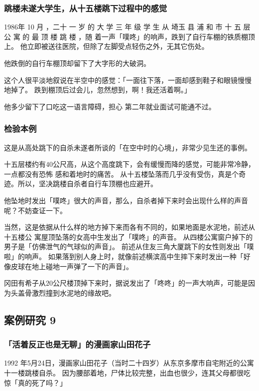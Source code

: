 \documentclass[UTF8]{ctexart}
\begin{document}
\subsubsection*{跳楼未遂大学生，从十五楼跳下过程中的感觉}

1986年 10 月 ，二十 一 岁 的 大 学 三 年 级 学 生 从 埼玉 县 浦 和 市 十 五 层 公 寓 的 最 顶 楼 跳 楼 ，随 着一声「噗咚」的响声，跌到了自行车棚的铁质棚顶上。
他立即被送往医院，但除了左脚受点轻伤之外，无其它伤处。

他跌倒的自行车棚顶却留下了大字形的大破洞。

这个人很平淡地叙说在半空中的感觉：「一面往下落，一面却感到鞋子和眼镜慢慢地掉了。
跌到棚顶后过会儿，忽然想到，啊！我还活着啊。」

他多少留下了口吃这一语言障碍，担心 第二年就业面试可能通不过。 

\subsubsection*{检验本例}


这是从高处跳下的自杀未遂者所谈的「在空中时的心境」，非常少见生还的事例。

十五层楼约有$40$公尺高，从这个高度跳下，会有缓慢而降的感觉，可能非常冷静，一点都没有恐怖
感和着地时的痛苦。
从十五楼坠落而几乎没有受伤，真是个奇迹。所以，坚决跳楼自杀者自行车顶棚也应避开。

他坠地时发出「噗咚」很大的声音，那么，自杀者掉下来时会出现什么样的声音呢？不妨查证一下。

当然，这是依据从什么样的地方掉下来而各有不同的，如果地面是水泥地，前述从十五楼公
寓屋顶坠落的女高中生发出了「噗咚」的声音。
从四楼公寓窗户掉下的男子是「仿佛泄气的气球似的声音」。
前述从住友三角大厦跳下的女性则发出「噗啦」的响声。
如果落到别人身上时，就像前述横滨高中生摔下来时发出一种「好像皮球在地上碰地一声弹了一下的声音」。

冈田有希子从$20$公尺楼顶掉下来时，据说发出了「咚咚」的一声大响声，可能是因为头盖骨激烈撞到水泥地的缘故吧。

\subsection{案例研究 9}
\subsubsection*{「活着反正也是无聊」的漫画家山田花子}

1992 年5月24日，漫画家山田花子（当时二十四岁）从东京多摩市自宅附近的公寓十一楼跳楼自杀。
因为腰部着地，尸体比较完整，出血也很少，连其父母都很吃惊「真的死了吗？」
\end{document}
